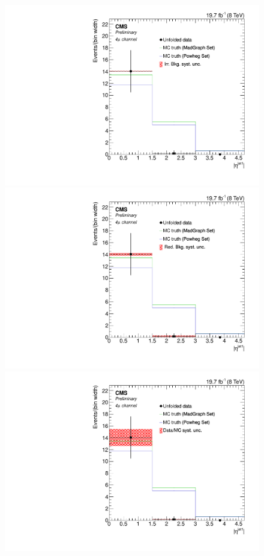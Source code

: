 \begin{figure}[hbtp]
\begin{center}
   \includegraphics[width=0.8\cmsFigWidth]{Figures/Unfolding/Systematics/ZZTo4m_EtaJet1_IrrBkg_Mad_fr}
   \includegraphics[width=0.8\cmsFigWidth]{Figures/Unfolding/Systematics/ZZTo4m_EtaJet1_RedBkg_Mad_fr}     
  \includegraphics[width=0.8\cmsFigWidth]{Figures/Unfolding/Systematics/ZZTo4m_EtaJet1_UnfDataOverGenMC_Mad_fr}     

\end{center}
\end{figure}
